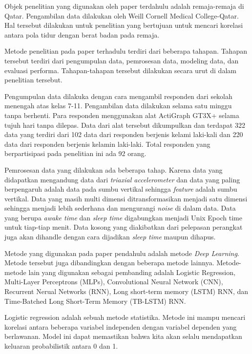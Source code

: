 \documentclass[12pt, a4paper, twoside]{article}
\begin{document}
Objek penelitian yang digunakan oleh paper terdahulu adalah remaja-remaja di Qatar. Pengambilan data dilakukan oleh Weill Cornell Medical College-Qatar. Hal tersebut dilakukan untuk penelitian yang bertujuan untuk mencari korelasi antara pola tidur dengan berat badan pada remaja.

Metode penelitian pada paper terhadulu terdiri dari beberapa tahapan. Tahapan tersebut terdiri dari pengumpulan data, pemrosesan data, modeling data, dan evaluasi performa. Tahapan-tahapan tersebut dilakukan secara urut di dalam penelitian tersebut.

Pengumpulan data dilakuka dengan cara mengambil responden dari sekolah menengah atas kelas 7-11. Pengambilan data dilakukan selama satu minggu tanpa berhenti. Para responden menggunakan alat ActiGraph GT3X+ selama tujuh hari tanpa dilepas. Data dari alat tersebut dikumpulkan dan terdapat 322 data yang terdiri dari 102 data dari responden berjenis kelami laki-kali dan 220 data dari responden berjenis kelamin laki-laki. Total responden yang berpartisipasi pada penelitian ini ada 92
orang.

Pemrosesan data yang dilakukan ada beberapa tahap. Karena data yang didapatkan mengandung data dari \textit{triaxial accelerometer} dan data yang paling berpengaruh adalah data pada sumbu vertikal sehingga \textit{feature} adalah sumbu vertikal. Data yang masih multi dimensi ditransformasikan menjadi satu dimensi sehingga menjadi lebih sederhana dan mengurangi \textit{noise} di dalam data. Data yang berupa \textit{awake time} dan \textit{sleep time} digabungkan menjadi Unix
Epoch time untuk tiap-tiap menit. Data kosong yang diakibatkan dari pelepasan perangkat juga akan dihandle dengan cara dijadikan \textit{sleep time} maupun dihapus. 

Metode yang digunakan pada paper pendahulu adalah metode \textit{Deep Learning}. Metode tersebut juga dibandingkan dengan beberapa metode lainnya. Metode-metode lain yang digunakan sebagai pembanding adalah Logistic Regression, Multi-Layer Perceptrons (MLPs), Convolutional Neural Network (CNN), Recurrent Nerual Networks (RNN), Long short-term memory (LSTM) RNN, dan Time-Batched Long Short-Term Memory (TB-LSTM) RNN.

Logistic regression adalah sebuah metode statistika. Metode ini mampu mencari korelasi antara beberapa variabel independen dengan variabel dependen yang berlawanan. Model ini dapat memastikan bahwa kita akan selalu mendapatkan keluaran probabilistik antara 0 dan 1. \cite{Kleinbaum.2010}
\end{document}
